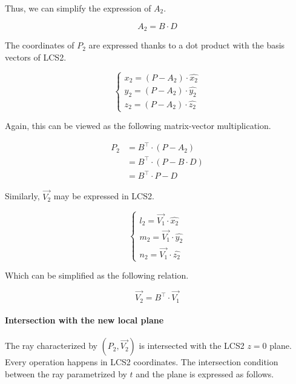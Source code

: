 Thus, we can simplify the expression of $A_2$.

\begin{equation}
A_2 = B \cdot D
\end{equation}

The coordinates of $P_2$ are expressed thanks to a dot product with the basis
vectors of LCS2.

\begin{equation} \begin{cases}
x_2 = (P - A_2) \cdot \hat{x_2} \\
y_2 = (P - A_2) \cdot \hat{y_2} \\
z_2 = (P - A_2) \cdot \hat{z_2}
\end{cases} \end{equation}

Again, this can be viewed as the following matrix-vector multiplication.

\begin{equation} \begin{split}
P_2 &= B^\top \cdot (P - A_2) \\
    &= B^\top \cdot (P - B \cdot D) \\
    &= B^\top \cdot P - D
\end{split} \end{equation}

Similarly, $\overrightarrow{V_2}$ may be expressed in LCS2.

\begin{equation} \begin{cases}
l_2 = \overrightarrow{V_1} \cdot \hat{x_2} \\
m_2 = \overrightarrow{V_1} \cdot \hat{y_2} \\
n_2 = \overrightarrow{V_1} \cdot \hat{z_2}
\end{cases} \end{equation}

Which can be simplified as the following relation.

\begin{equation}
\overrightarrow{V_2} = B^\top \cdot \overrightarrow{V_1}
\end{equation}

\paragraph{Intersection with the new local plane}
The ray characterized by $(P_2, \overrightarrow{V_2})$ is intersected
with the LCS2 $z = 0$ plane. Every operation happens in LCS2 coordinates.
The intersection condition between the ray parametrized by $t$ and the
plane is expressed as follows.

